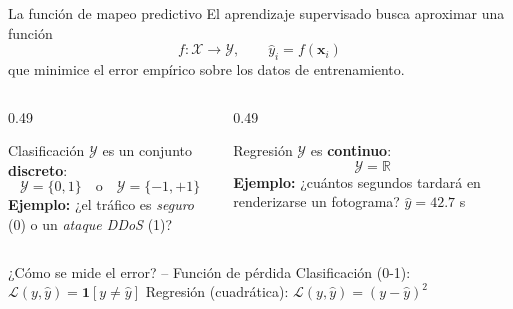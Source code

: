 \documentclass[10pt,aspectratio=169]{beamer}
\newcommand{\ejemplo}[1]{\textcolor{usfxdorado}{\textbf{#1}}}
\begin{document}
\begin{frame}{La función de mapeo predictivo}
  El aprendizaje supervisado busca aproximar una función
  \[
    f:\mathcal{X}\to\mathcal{Y}, \qquad \hat{y}_i = f(\mathbf{x}_i)
  \]
  que minimice el error empírico sobre los datos de entrenamiento.
  \medskip
  \begin{columns}[T]
    \begin{column}{0.49\textwidth}
      \begin{block}{Clasificación}
        $\mathcal{Y}$ es un conjunto \textbf{discreto}:
        \[ \mathcal{Y}=\{0,1\} \quad\text{o}\quad \mathcal{Y}=\{-1,+1\} \]
        \small\ejemplo{Ejemplo:} ¿el tráfico es \emph{seguro} (0) o un \emph{ataque DDoS} (1)?
      \end{block}
    \end{column}
    \begin{column}{0.49\textwidth}
      \begin{block}{Regresión}
        $\mathcal{Y}$ es \textbf{continuo}:
        \[ \mathcal{Y}=\mathbb{R} \]
        \small\ejemplo{Ejemplo:} ¿cuántos segundos tardará en renderizarse un fotograma? \; $\hat{y}=42.7$ s
      \end{block}
    \end{column}
  \end{columns}
  \medskip
  \begin{alertblock}{¿Cómo se mide el error? -- Función de pérdida}
    \small
    Clasificación (0-1): $\mathcal{L}(y,\hat{y}) = \mathbf{1}[y\neq\hat{y}]$
    \qquad
    Regresión (cuadrática): $\mathcal{L}(y,\hat{y}) = (y-\hat{y})^2$
  \end{alertblock}
\end{frame}
\end{document}
